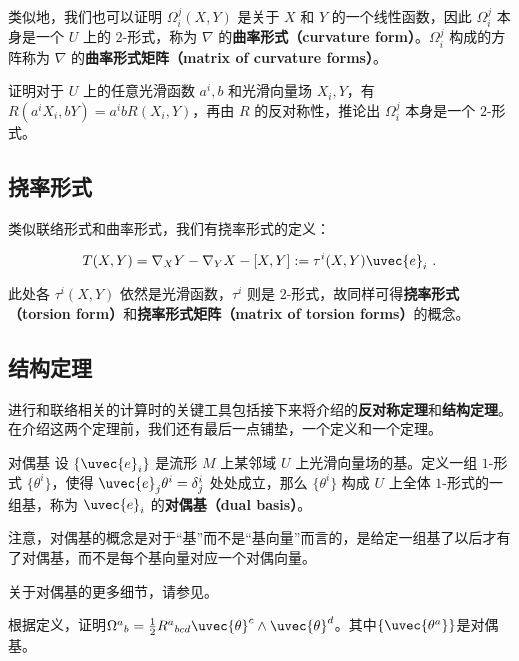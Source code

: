 类似地，我们也可以证明 $\Omega^j_i(X, Y)$ 是关于 $X$ 和 $Y$ 的一个线性函数，因此 $\Omega^j_i$ 本身是一个 $U$ 上的 $2$-形式，称为 $\nabla$ 的\textbf{曲率形式（curvature form）}。$\Omega^j_i$ 构成的方阵称为 $\nabla$ 的\textbf{曲率形式矩阵（matrix of curvature forms）}。

\begin{exercise}{}
证明对于 $U$ 上的任意光滑函数 $a^i, b$ 和光滑向量场 $X_i, Y$，有 $R(a^iX_i, bY)=a^ibR(X_i, Y)$，再由 $R$ 的反对称性，推论出 $\Omega^j_i$ 本身是一个 $2$-形式。
\end{exercise}

\subsection{挠率形式}


类似联络形式和曲率形式，我们有挠率形式的定义：

\begin{equation}
T(X, Y)=\nabla_XY-\nabla_YX-[X, Y]:=\tau^i(X, Y)\uvec{e}_i~.
\end{equation}

此处各 $\tau^i(X, Y)$ 依然是光滑函数，$\tau^i$ 则是 $2$-形式，故同样可得\textbf{挠率形式（torsion form）}和\textbf{挠率形式矩阵（matrix of torsion forms）}的概念。





\subsection{结构定理}

进行和联络相关的计算时的关键工具包括接下来将介绍的\textbf{反对称定理}和\textbf{结构定理}。在介绍这两个定理前，我们还有最后一点铺垫，一个定义和一个定理。


\begin{definition}{对偶基}
设 $\{\uvec{e}_i\}$ 是流形 $M$ 上某邻域 $U$ 上光滑向量场的基。定义一组 $1$-形式 $\{\theta^i\}$，使得 $\uvec{e}_j\theta^i=\delta^i_j$ 处处成立，那么 $\{\theta^i\}$ 构成 $U$ 上全体 $1$-形式的一组基，称为 $\uvec{e}_i$ 的\textbf{对偶基（dual basis）}。
\end{definition}


注意，对偶基的概念是对于“基”而不是“基向量”而言的，是给定一组基了以后才有了对偶基，而不是每个基向量对应一个对偶向量。

关于对偶基的更多细节，请参见。
\begin{exercise}{}
根据定义，证明$\Omega^{a}{ }_{b}=\frac{1}{2} R^{a}{ }_{b c d} \uvec{\theta}^{c} \wedge \uvec{\theta}^{d}$。其中$\{\uvec{\theta^a}\}$是对偶基。
\end{exercise}{}

